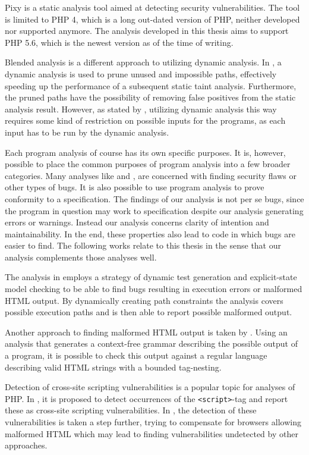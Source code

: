 Pixy  is a static analysis tool aimed at detecting security vulnerabilities. The tool is limited to PHP 4, which is a long out-dated version of PHP, neither developed nor supported anymore. The analysis developed in this thesis aims to support PHP 5.6, which is the newest version as of the time of writing.

Blended analysis is a different approach to utilizing dynamic analysis. In , a dynamic analysis is used to prune unused and impossible paths, effectively speeding up the performance of a subsequent static taint analysis. Furthermore, the pruned paths have the possibility of removing false positives from the static analysis result. However, as stated by , utilizing dynamic analysis this way requires some kind of restriction on possible inputs for the programs, as each input has to be run by the dynamic analysis. %


Each program analysis of course has its own specific purposes. It is, however, possible to place the common purposes of program analysis into a few broader categories. Many analyses like  and , are concerned with finding security flaws or other types of bugs. It is also possible to use program analysis to prove conformity to a specification. The findings of our analysis is not per se bugs, since the program in question may work to specification despite our analysis generating errors or warnings. Instead our analysis concerns clarity of intention and maintainability. In the end, these properties also lead to code in which bugs are easier to find. The following works relate to this thesis in the sense that our analysis complements those analyses well.

The analysis in  employs a strategy of dynamic test generation and explicit-state model checking to be able to find bugs resulting in execution errors or malformed HTML output. By dynamically creating path constraints the analysis covers possible execution paths and is then able to report possible malformed output.

Another approach to finding malformed HTML output is taken by . Using an analysis that generates a context-free grammar describing the possible output of a program, it is possible to check this output against a regular language describing valid HTML strings with a bounded tag-nesting.

Detection of cross-site scripting vulnerabilities is a popular topic for analyses of PHP. In , it is proposed to detect occurrences of the \texttt{<script>}-tag and report these as cross-site scripting vulnerabilities. In , the detection of these vulnerabilities is taken a step further, trying to compensate for browsers allowing malformed HTML which may lead to finding vulnerabilities undetected by other approaches.
